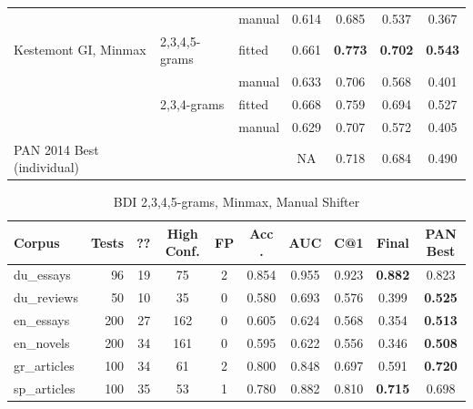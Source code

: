 \documentclass[
    hf,
]{ceurart}
\begin{document}
\begin{table}
\begin{tabular}{lllcccc}
                                   &               & manual  & 0.614          & 0.685           & 0.537          & 0.367          \\
        Kestemont GI, Minmax       & 2,3,4,5-grams & fitted  & 0.661          & \textbf{ 0.773} & \textbf{0.702} & \textbf{0.543} \\
                                   &               & manual  & 0.633          & 0.706           & 0.568          & 0.401          \\
                                   & 2,3,4-grams   & fitted  & 0.668          & 0.759           & 0.694          & 0.527          \\
                                   &               & manual  & 0.629          & 0.707           & 0.572          & 0.405          \\
        PAN 2014 Best (individual) &               &         & NA             & 0.718           & 0.684          & 0.490          \\
        \bottomrule
    \end{tabular}
\end{table}

\begin{table}
    \caption{BDI 2,3,4,5-grams, Minmax, Manual Shifter}
    \label{tab:bdi}
    \raggedright
    \begin{tabular}{@{}lrrccccccc}
        \toprule
        Corpus       & Tests & ?? & High Conf. & FP & Acc  . & AUC   & C@1   & Final          & PAN Best       \\
        \midrule
        du\_essays   & 96    & 19 & 75         & 2  & 0.854  & 0.955 & 0.923 & \textbf{0.882} & 0.823          \\
        du\_reviews  & 50    & 10 & 35         & 0  & 0.580  & 0.693 & 0.576 & 0.399          & \textbf{0.525} \\
        en\_essays   & 200   & 27 & 162        & 0  & 0.605  & 0.624 & 0.568 & 0.354          & \textbf{0.513} \\
        en\_novels   & 200   & 34 & 161        & 0  & 0.595  & 0.622 & 0.556 & 0.346          & \textbf{0.508} \\
        gr\_articles & 100   & 34 & 61         & 2  & 0.800  & 0.848 & 0.697 & 0.591          & \textbf{0.720} \\
        sp\_articles & 100   & 35 & 53         & 1  & 0.780  & 0.882 & 0.810 & \textbf{0.715} & 0.698          \\
        \bottomrule
    \end{tabular}
\end{table}
\end{document}
